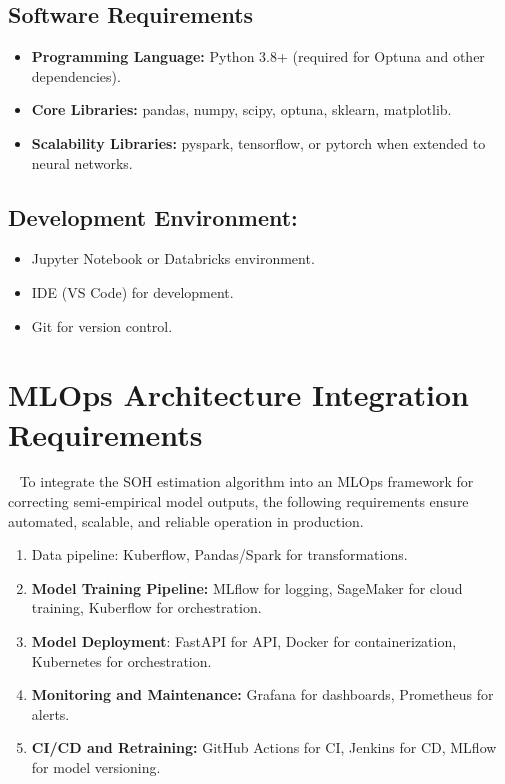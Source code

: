 \subsection{Software Requirements}
\begin{itemize}
    \item \textbf{Programming Language:} Python 3.8+ (required for Optuna and other dependencies).
    \item \textbf{Core Libraries:} pandas, numpy, scipy, optuna, sklearn, matplotlib.
    \item \textbf{Scalability Libraries:} pyspark, tensorflow, or pytorch when extended to neural networks.
\end{itemize}

\subsection{Development Environment:}
\begin{itemize}
    \item Jupyter Notebook or Databricks environment.
    \item IDE (VS Code) for development.
    \item Git for version control.
\end{itemize}

\section{MLOps Architecture Integration Requirements}\
\label{MLOPS-arch}
To integrate the SOH estimation algorithm into an MLOps framework for correcting semi-empirical model outputs, the following requirements ensure automated, scalable, and reliable operation in production.
\begin{enumerate}
    \item Data pipeline: Kuberflow, Pandas/Spark for transformations.
    \item \textbf{Model Training Pipeline:} MLflow for logging, SageMaker for cloud training, Kuberflow for orchestration.
    \item \textbf{Model Deployment}: FastAPI for API, Docker for containerization, Kubernetes for orchestration.
    \item \textbf{Monitoring and Maintenance:} Grafana for dashboards, Prometheus for alerts.
    \item \textbf{CI/CD and Retraining:} GitHub Actions for CI, Jenkins for CD, MLflow for model versioning.
\end{enumerate}

